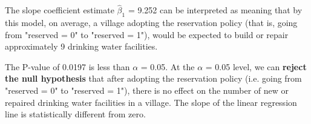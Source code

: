 \documentclass[12pt,letterpaper]{article}
\begin{document}
\begin{enumerate}
The slope coefficient estimate $\hat{\beta}_1$ = 9.252 can be interpreted as meaning that by this model, on average, a village adopting the reservation policy (that is, going from "reserved = 0" to "reserved = 1"), would be expected to build or repair approximately 9 drinking water facilities. 
	
The P-value of 0.0197 is less than $\alpha$ = 0.05. At the $\alpha$ = 0.05 level, we can \textbf{reject the null hypothesis} that after adopting the reservation policy (i.e. going from "reserved = 0" to "reserved = 1"), there is no effect on the number of new or repaired drinking water facilities in a village. The slope of the linear regression line is statistically different from zero.
\end{enumerate}


\end{document}
